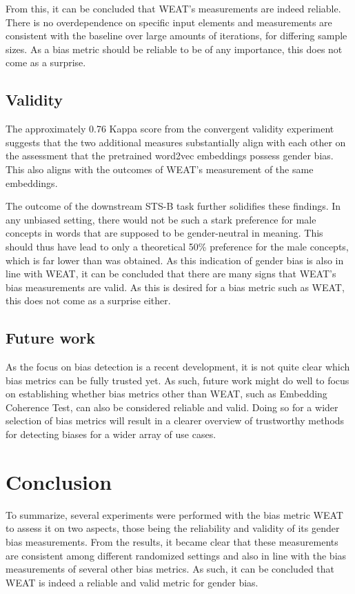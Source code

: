 \documentclass[11pt]{article}
\begin{document}
From this, it can be concluded that WEAT's measurements are indeed reliable. There is no overdependence on specific input elements and measurements are consistent with the baseline over large amounts of iterations, for differing sample sizes. As a bias metric should be reliable to be of any importance, this does not come as a surprise.

\subsection{Validity}
The approximately 0.76 Kappa score from the convergent validity experiment suggests that the two additional measures substantially align with each other on the assessment that the pretrained word2vec embeddings possess gender bias. This also aligns with the outcomes of WEAT's measurement of the same embeddings.

The outcome of the downstream STS-B task further solidifies these findings. In any unbiased setting, there would not be such a stark preference for male concepts in words that are supposed to be gender-neutral in meaning. This should thus have lead to only a theoretical 50\% preference for the male concepts, which is far lower than was obtained. As this indication of gender bias is also in line with WEAT, it can be concluded that there are many signs that WEAT's bias measurements are valid. As this is desired for a bias metric such as WEAT, this does not come as a surprise either.

\subsection{Future work}
As the focus on bias detection is a recent development, it is not quite clear which bias metrics can be fully trusted yet\cite{norwegian_salmon}. As such, future work might do well to focus on establishing whether bias metrics other than WEAT, such as Embedding Coherence Test\cite{ect}, can also be considered reliable and valid. Doing so for a wider selection of bias metrics will result in a clearer overview of trustworthy methods for detecting biases for a wider array of use cases.  

\section{Conclusion}
To summarize, several experiments were performed with the bias metric WEAT to assess it on two aspects, those being the reliability and validity of its gender bias measurements. From the results, it became clear that these measurements are consistent among different randomized settings and also in line with the bias measurements of several other bias metrics. As such, it can be concluded that WEAT is indeed a reliable and valid metric for gender bias.  
\end{document}
